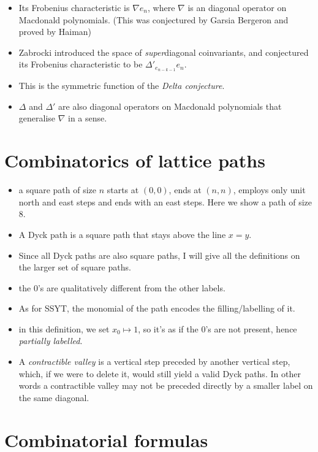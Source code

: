 \documentclass{article}
\begin{document}
\begin{itemize}
        \item Its Frobenius characteristic is $\nabla e_n$, where $\nabla$ is an diagonal operator on Macdonald polynomials. (This was conjectured by Garsia Bergeron and proved by Haiman)
        \item Zabrocki introduced the space of \emph{super}diagonal coinvariants, and conjectured its Frobenius characteristic to be $\Delta'_{e_{n-k-1}}e_n$. 
        \item This is the symmetric function of the \emph{Delta conjecture}.
        \item $\Delta$ and $\Delta'$ are also diagonal operators on Macdonald polynomials that generalise $\nabla$ in a sense. 
    \end{itemize}

    \section{Combinatorics of lattice paths}
    \begin{itemize}
        \item a square path of size $n$ starts at $(0,0)$, ends at $(n,n)$, employs only unit north and east steps and ends with an east steps. Here we show a path of size $8$.
        \item A Dyck path is a square path that stays above the line $x=y$. 
        \item Since all Dyck paths are also square paths, I will give all the definitions on the larger set of square paths.
        \item the $0$'s are qualitatively different from the other labels.
        \item As for SSYT, the monomial of the path encodes the filling/labelling of it.
        \item in this definition, we set $x_0\mapsto 1$, so  it's as if the $0$'s are not present, hence \emph{partially labelled}.
        \item A \emph{contractible valley} is a vertical step preceded by another vertical step, which, if we were to delete it, would still yield a valid Dyck paths. In other words a contractible valley may not be preceded directly by a smaller label on the same diagonal.
    \end{itemize}

\section{Combinatorial formulas}
\end{document}
